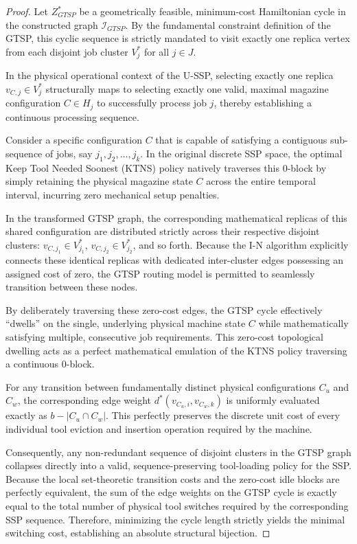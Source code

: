 \documentclass[11pt, a4paper]{book}
\begin{document}
	\begin{proof}
		Let $Z_{GTSP}^*$ be a geometrically feasible, minimum-cost Hamiltonian cycle in the constructed graph $\mathcal{I}_{GTSP}$. By the fundamental constraint definition of the GTSP, this cyclic sequence is strictly mandated to visit exactly one replica vertex from each disjoint job cluster $V_j^*$ for all $j \in J$. %
		
		In the physical operational context of the U-SSP, selecting exactly one replica $v_{C,j} \in V_j^*$ structurally maps to selecting exactly one valid, maximal magazine configuration $C \in H_j$ to successfully process job $j$, thereby establishing a continuous processing sequence. %
		
		Consider a specific configuration $C$ that is capable of satisfying a contiguous sub-sequence of jobs, say $j_1, j_2, \dots, j_k$. In the original discrete SSP space, the optimal Keep Tool Needed Soonest (KTNS) policy natively traverses this 0-block by simply retaining the physical magazine state $C$ across the entire temporal interval, incurring zero mechanical setup penalties. %
		
		In the transformed GTSP graph, the corresponding mathematical replicas of this shared configuration are distributed strictly across their respective disjoint clusters: $v_{C,j_1} \in V_{j_1}^*$, $v_{C,j_2} \in V_{j_2}^*$, and so forth. Because the I-N algorithm explicitly connects these identical replicas with dedicated inter-cluster edges possessing an assigned cost of zero, the GTSP routing model is permitted to seamlessly transition between these nodes. %
		
		By deliberately traversing these zero-cost edges, the GTSP cycle effectively ``dwells'' on the single, underlying physical machine state $C$ while mathematically satisfying multiple, consecutive job requirements. This zero-cost topological dwelling acts as a perfect mathematical emulation of the KTNS policy traversing a continuous 0-block. %
		
		For any transition between fundamentally distinct physical configurations $C_u$ and $C_w$, the corresponding edge weight $d^*(v_{C_u, i}, v_{C_w, k})$ is uniformly evaluated exactly as $b - |C_u \cap C_w|$. This perfectly preserves the discrete unit cost of every individual tool eviction and insertion operation required by the machine. %
		
		Consequently, any non-redundant sequence of disjoint clusters in the GTSP graph collapses directly into a valid, sequence-preserving tool-loading policy for the SSP. Because the local set-theoretic transition costs and the zero-cost idle blocks are perfectly equivalent, the sum of the edge weights on the GTSP cycle is exactly equal to the total number of physical tool switches required by the corresponding SSP sequence. Therefore, minimizing the cycle length strictly yields the minimal switching cost, establishing an absolute structural bijection. %
	\end{proof}
	
\end{document}
